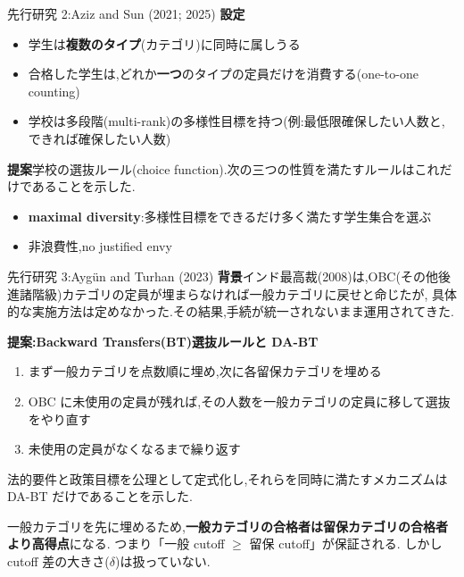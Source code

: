 \documentclass[aspectratio=43,11pt]{beamer}
\begin{document}
\begin{frame}{先行研究 2:Aziz and Sun (2021; 2025)}
\small
\textbf{設定}
\begin{itemize}
  \item 学生は\textbf{複数のタイプ}(カテゴリ)に同時に属しうる
  \item 合格した学生は,どれか\textbf{一つ}のタイプの定員だけを消費する(one-to-one counting)
  \item 学校は多段階(multi-rank)の多様性目標を持つ(例:最低限確保したい人数と,できれば確保したい人数)
\end{itemize}

\medskip
\textbf{提案}\quad 学校の選抜ルール(choice function).次の三つの性質を満たすルールはこれだけであることを示した.
\begin{itemize}
  \item \textbf{maximal diversity}:\alert{多様性目標をできるだけ多く満たす}学生集合を選ぶ
  \item 非浪費性,no justified envy
\end{itemize}
\end{frame}

\begin{frame}{先行研究 3:Aygün and Turhan (2023)}
\small
\textbf{背景}\quad インド最高裁(2008)は,OBC(その他後進諸階級)カテゴリの定員が埋まらなければ一般カテゴリに戻せと命じたが,
\alert{具体的な実施方法は定めなかった}.その結果,手続が統一されないまま運用されてきた.

\medskip
\textbf{提案:Backward Transfers(BT)選抜ルールと DA-BT}
\begin{enumerate}
  \item まず一般カテゴリを点数順に埋め,次に各留保カテゴリを埋める
  \item OBC に未使用の定員が残れば,その人数を一般カテゴリの定員に移して選抜をやり直す
  \item 未使用の定員がなくなるまで繰り返す
\end{enumerate}
法的要件と政策目標を公理として定式化し,それらを同時に満たすメカニズムは DA-BT だけであることを示した.

\medskip
一般カテゴリを先に埋めるため,\textbf{一般カテゴリの合格者は留保カテゴリの合格者より高得点}になる.
つまり「一般 cutoff $\geq$ 留保 cutoff」が保証される.
しかし\alert{cutoff 差の大きさ($\delta$)は扱っていない}.
\end{frame}
\end{document}
